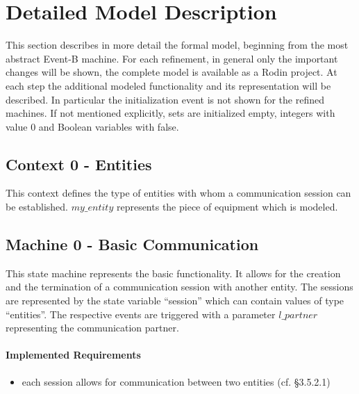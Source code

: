 \documentclass[10pt,a4paper]{article}
\begin{document}
\section{Detailed Model Description}
\label{sec:deta-model-descr}

This section describes in more detail the formal model, beginning from the most
abstract Event-B machine. For each refinement, in general only the important
changes will be shown, the complete model is available as a Rodin project. At
each step the additional modeled functionality and its representation will be
described.  In particular the initialization event is not shown for the refined
machines. If not mentioned explicitly, sets are initialized empty, integers with
value 0 and Boolean variables with false.


\subsection{Context 0 - Entities}
\label{sec:context-0-entities}

This context defines the type of entities with whom a communication session can
be established.  $my\_entity$ represents the piece of equipment which is
modeled.



\subsection{Machine 0 - Basic Communication}
\label{sec:machine-0-basic}

This state machine represents the basic functionality. It allows for the
creation and the termination of a communication session with another entity. The
sessions are represented by the state variable ``session'' which can contain
values of type ``entities''. The respective events are triggered with a
parameter $l\_partner$ representing the communication partner.

\paragraph{Implemented Requirements}
\label{sec:impl-requ}

\begin{itemize}
\item each session allows for communication between two entities (cf. §3.5.2.1)
\end{itemize}


\end{document}
